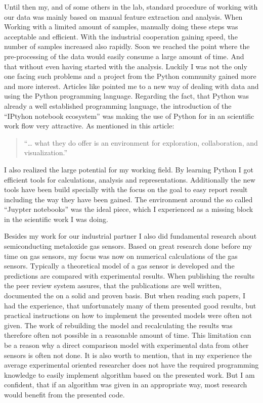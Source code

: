 \documentclass[11pt]{article}
\begin{document}
Until then my, and of some others in the lab, standard procedure of
working with our data was mainly based on manual feature extraction and
analysis. When Working with a limited amount of samples, manually doing
these steps was acceptable and efficient. With the industrial
cooperation gaining speed, the number of samples increased also rapidly.
Soon we reached the point where the pre-processing of the data would
easily consume a large amount of time. And that without even having
started with the analysis. Luckily I was not the only one facing such
problems and a project from the Python community gained more and more
interest. Articles like \cite{Unpingco2014} pointed me to a new way of
dealing with data and using the Python programming language. Regarding
the fact, that Python was already a well established programming
language, the introduction of the ``IPtyhon notebook ecosystem'' was
making the use of Python for in an scientific work flow very attractive.
As mentioned in this article: \cite{Osipov2016}

\begin{quote}
``\ldots{} what they do offer is an environment for exploration,
collaboration, and visualization.''
\end{quote}

I also realized the large potential for my working field. By learning
Python I got efficient tools for calculations, analysis and
representations. Additionally the new tools have been build specially
with the focus on the goal to easy report result including the way they
have been gained. The environment around the so called ``Juypter
notebooks'' was the ideal piece, which I experienced as a missing block
in the scientific work I was doing.

Besides my work for our industrial partner I also did fundamental
research about semiconducting metaloxide gas sensors. Based on great
research done before my time on gas sensors, my focus was now on
numerical calculations of the gas sensors. Typically a theoretical model
of a gas sensor is developed and the predictions are compared with
experimental results. When publishing the results the peer review system
assures, that the publications are well written, documented the on a
solid and proven basis. But when reading such papers, I had the
experience, that unfortunately many of them presented good results, but
practical instructions on how to implement the presented models were
often not given. The work of rebuilding the model and recalculating the
results was therefore often not possible in a reasonable amount of time.
This limitation can be a reason why a direct comparison model with
experimental data from other sensors is often not done. It is also worth
to mention, that in my experience the average experimental oriented
researcher does not have the required programming knowledge to easily
implement algorithm based on the presented work. But I am confident,
that if an algorithm was given in an appropriate way, most research
would benefit from the presented code.
\end{document}
